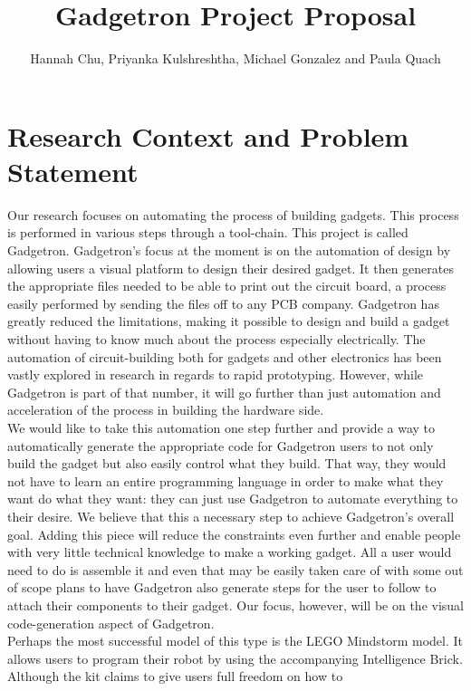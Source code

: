 \documentclass[12pt]{article}
\begin{document}
\author{Hannah Chu, Priyanka Kulshreshtha, Michael Gonzalez and Paula Quach}
\title{Gadgetron Project Proposal}
\maketitle

\section{Research Context and Problem Statement}
    Our research focuses on automating the process of building gadgets. This process is performed in various steps through a tool-chain. This project is called Gadgetron. Gadgetron's focus at the moment is on the automation of design by allowing users a visual platform to design their desired gadget. It then generates the appropriate files needed to be able to print out the circuit board, a process easily performed by sending the files off to any PCB company. Gadgetron has greatly reduced the limitations, making it possible to design and build a gadget without having to know much about
	the process especially electrically. The automation of circuit-building both for gadgets and other electronics has been vastly explored in research in regards to rapid prototyping. However, while Gadgetron is part of that number, it will go further than just automation and acceleration of the process in building the hardware side.\\[7pt]
	We would like to take this automation one step further and provide a way to automatically generate the appropriate code for Gadgetron users to not only build the gadget but also easily control what they build. That way, they would not have to learn an entire programming language in order to make what they want do what they want: they can just use Gadgetron to automate everything to their desire. We believe that this a necessary step to achieve Gadgetron's overall goal. Adding this piece will reduce the constraints even further and enable people with very little technical knowledge to make a working gadget. All a user would need to do is assemble it and even that may be easily taken care of with some out of scope plans to have Gadgetron also generate steps for the user to follow to attach their components to their gadget. Our focus, however, will be on the visual code-generation aspect of Gadgetron.\\[7pt]
	Perhaps the most successful model of this type is the LEGO Mindstorm model. It allows users to program their robot by using the accompanying Intelligence Brick. Although the kit claims to give users full freedom on how to 
\end{document}
